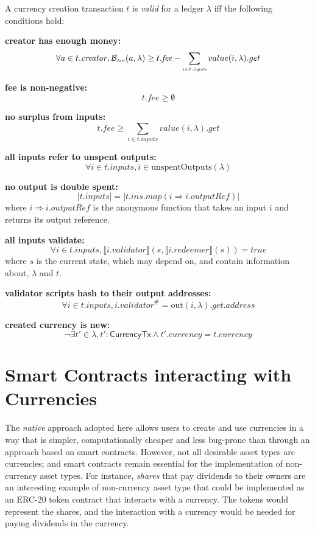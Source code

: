 \documentclass{llncs}
\newcommand{\hash}[1]{#1^{\scriptscriptstyle\#}}
\newcommand{\type}[1]{\mathsf{#1}}
\newcommand{\currencyCreationT}{\type{CurrencyTx}}
\newcommand{\field}[1]{\mathit{#1}}
\newcommand{\ins}{\field{inputs}}
\newcommand{\fee}{\field{fee}}
\newcommand{\address}{\field{address}}
\newcommand{\outputRef}{\field{outputRef}}
\newcommand{\validator}{\field{validator}}
\newcommand{\redeemer}{\field{redeemer}}
\newcommand{\creator}{\field{creator}}
\newcommand{\currency}{\field{currency}}
\newcommand{\func}[1]{\mathrm{#1}}
\newcommand{\outputSpentBy}{\func{out}}
\newcommand{\unspentOuts}{\func{unspentOutputs}}
\newcommand{\true}{\field{true}}
\newcommand{\interpret}[1]{\llbracket #1 \rrbracket}
\newcommand{\balance}{\mathcal{B}}
\newcommand{\accountBalance}{\balance_{\scriptscriptstyle\mathrm{\textsc{Acc}}}}
\newenvironment{smallish}{
	\begin{small}
}{
	\end{small}
}
\begin{document}
\begin{definition}
\label{def:Valid-Currency-Creation}
A currency creation transaction $t$ is \emph{valid} for a ledger $\lambda$
iff the following conditions hold:

\begin{smallish}
\textbf{creator has enough money:}
$$\forall a \in t.\creator, \accountBalance(a, \lambda) \ge t.\fee - \sum_{\scriptscriptstyle i \in t.\ins}value(i, \lambda).get$$

\textbf{fee is non-negative:}
$$t.\fee \ge \emptyset$$

\textbf{no surplus from inputs:}
$$t.\fee \ge \sum_{\scriptscriptstyle i \in t.\ins} value(i, \lambda).get$$

\textbf{all inputs refer to unspent outputs:}
$$\forall i \in t.\ins, i \in \unspentOuts(\lambda)$$

\textbf{no output is double spent:}
$$|t.\ins| = |t.ins.map(i \Rightarrow i.\outputRef)|$$
where $i \Rightarrow i.\outputRef$ is the anonymous function that takes an input $i$ and returns its output reference.

\textbf{all inputs validate:}
$$\forall i \in t.\ins, \interpret{i.\validator}(s, \interpret{i.\redeemer}(s)) = \true$$
where $s$ is the current state, which may depend on, and contain information about, $\lambda$ and $t$.

\textbf{validator scripts hash to their output addresses:}
$$\forall i \in t.\ins, \hash{i.\validator} = \outputSpentBy(i, \lambda).get.\address$$

\textbf{created currency is new:}
$$\neg \exists t' \in \lambda, t'\colon \currencyCreationT \wedge t'.\currency = t.\currency$$
\end{smallish}
\end{definition}





\section{Smart Contracts interacting with Currencies}
\label{sec:SmartContracts}

The \emph{native} approach adopted here allows users to create and use currencies in a way that is simpler, computationally cheaper and less bug-prone than through an approach based on smart contracts. However, not all desirable asset types are currencies; and smart contracts remain essential for the implementation of non-currency asset types. For instance, \emph{shares} that pay dividends to their owners are an interesting example of non-currency asset type that could be implemented as an ERC-20 token contract that interacts with a currency. The tokens would represent the shares, and the interaction with a currency would be needed for paying dividends in the currency.
\end{document}
